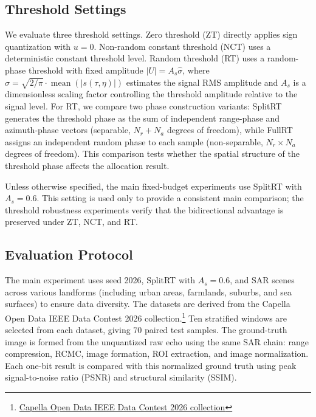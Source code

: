 \documentclass[conference]{IEEEtran}
\begin{document}
\subsection{Threshold Settings}

We evaluate three threshold settings. Zero threshold (ZT) directly applies sign quantization with $u=0$. Non-random constant threshold (NCT) uses a deterministic constant threshold level. Random threshold (RT) uses a random-phase threshold with fixed amplitude $|U|=A_s\hat{\sigma}$, where $\hat{\sigma}= \sqrt{2/\pi}\cdot\operatorname{mean}(|s(\tau,\eta)|)$ estimates the signal RMS amplitude and $A_s$ is a dimensionless scaling factor controlling the threshold amplitude relative to the signal level. For RT, we compare two phase construction variants: SplitRT generates the threshold phase as the sum of independent range-phase and azimuth-phase vectors (separable, $N_r+N_a$ degrees of freedom), while FullRT assigns an independent random phase to each sample (non-separable, $N_r\times N_a$ degrees of freedom). This comparison tests whether the spatial structure of the threshold phase affects the allocation result.

Unless otherwise specified, the main fixed-budget experiments use SplitRT with $A_s=0.6$. This setting is used only to provide a consistent main comparison; the threshold robustness experiments verify that the bidirectional advantage is preserved under ZT, NCT, and RT.

\subsection{Evaluation Protocol}

The main experiment uses seed 2026, SplitRT with $A_s=0.6$, and SAR scenes across various landforms (including urban areas, farmlands, suburbs, and sea surfaces) to ensure data diversity. The datasets are derived from the Capella Open Data IEEE Data Contest 2026 collection.\footnote{\href{https://radiantearth.github.io/stac-browser/\#/external/capella-open-data.s3.us-west-2.amazonaws.com/stac/capella-open-data-ieee-data-contest/collection.json}{Capella Open Data IEEE Data Contest 2026 collection}} Ten stratified windows are selected from each dataset, giving 70 paired test samples. The ground-truth image is formed from the unquantized raw echo using the same SAR chain: range compression, RCMC, image formation, ROI extraction, and image normalization. Each one-bit result is compared with this normalized ground truth using peak signal-to-noise ratio (PSNR) and structural similarity (SSIM).
\end{document}
